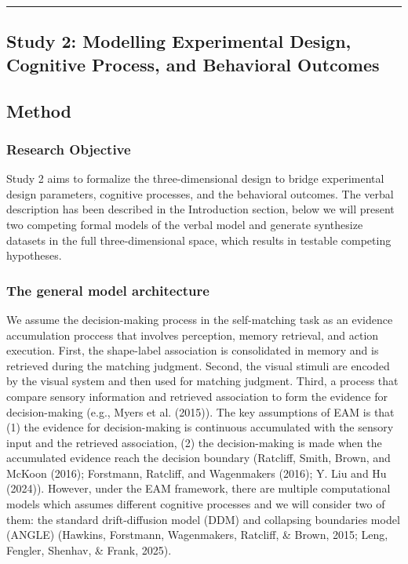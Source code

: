 \documentclass[
  english,
  man,floatsintext]{apa6}
\begin{document}
\begin{center}\rule{0.5\linewidth}{0.5pt}\end{center}

\subsection{Study 2: Modelling Experimental Design, Cognitive Process, and Behavioral Outcomes}\label{study-2-modelling-experimental-design-cognitive-process-and-behavioral-outcomes}

\subsection{Method}\label{method-1}

\subsubsection{Research Objective}\label{research-objective-1}

Study 2 aims to formalize the three-dimensional design to bridge experimental design parameters, cognitive processes, and the behavioral outcomes. The verbal description has been described in the Introduction section, below we will present two competing formal models of the verbal model and generate synthesize datasets in the full three-dimensional space, which results in testable competing hypotheses.

\subsubsection{The general model architecture}\label{the-general-model-architecture}

We assume the decision-making process in the self-matching task as an evidence accumulation proccess that involves perception, memory retrieval, and action execution. First, the shape-label association is consolidated in memory and is retrieved during the matching judgment. Second, the visual stimuli are encoded by the visual system and then used for matching judgment. Third, a process that compare sensory information and retrieved association to form the evidence for decision-making (e.g., Myers et al. (2015)). The key assumptions of EAM is that (1) the evidence for decision-making is continuous accumulated with the sensory input and the retrieved association, (2) the decision-making is made when the accumulated evidence reach the decision boundary (Ratcliff, Smith, Brown, and McKoon (2016); Forstmann, Ratcliff, and Wagenmakers (2016); Y. Liu and Hu (2024)). However, under the EAM framework, there are multiple computational models which assumes different cognitive processes and we will consider two of them: the standard drift-diffusion model (DDM) and collapsing boundaries model (ANGLE) (Hawkins, Forstmann, Wagenmakers, Ratcliff, \& Brown, 2015; Leng, Fengler, Shenhav, \& Frank, 2025).
\end{document}
